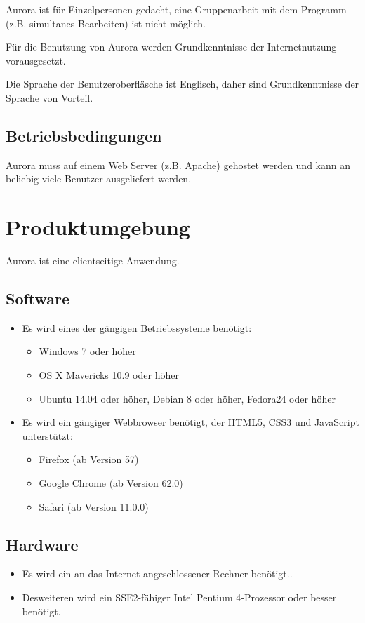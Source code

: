\documentclass[parskip=full,11pt,twoside]{scrartcl}
\begin{document}
Aurora ist für Einzelpersonen gedacht, eine Gruppenarbeit mit dem Programm (z.B. simultanes Bearbeiten) ist nicht möglich.

Für die Benutzung von Aurora werden Grundkenntnisse der Internetnutzung vorausgesetzt.

Die Sprache der Benutzeroberfläsche ist Englisch, daher sind Grundkenntnisse der Sprache von Vorteil.

\subsection{Betriebsbedingungen}

Aurora muss auf einem Web Server (z.B. Apache) gehostet werden und kann an beliebig viele Benutzer ausgeliefert werden.


\newpage
\section{Produktumgebung}
Aurora ist eine clientseitige Anwendung.

\subsection{Software}
	\begin{itemize}
		\item Es wird eines der gängigen Betriebssysteme benötigt:
		\begin{itemize}
			\item Windows 7 oder höher
			\item OS X Mavericks 10.9 oder höher
			\item Ubuntu 14.04 oder höher, Debian 8 oder höher, Fedora24 oder höher
		\end{itemize}
		\item Es wird ein gängiger Webbrowser benötigt, der HTML5, CSS3 und JavaScript unterstützt:
			\begin{itemize}
				\item Firefox (ab Version 57)
				\item Google Chrome (ab Version 62.0)
				\item Safari (ab Version 11.0.0)
			\end{itemize}
	\end{itemize}

\subsection{Hardware}
	\begin{itemize}
		\item Es wird ein an das Internet angeschlossener Rechner benötigt..
		\item Desweiteren wird ein SSE2-fähiger Intel Pentium 4-Prozessor oder besser benötigt.
	\end{itemize}
\end{document}
